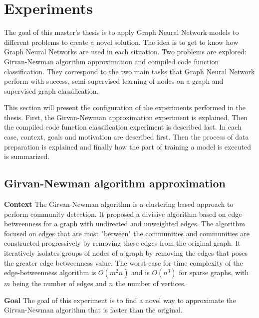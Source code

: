 \newpage
\section{Experiments}

The goal of this master's thesis is to apply Graph Neural Network models to different problems to create a novel solution. The idea is to get to know how Graph Neural Networks are used in each situation. Two problems are explored: Girvan-Newman algorithm approximation and compiled code function classification. They correspond to the two main tasks that Graph Neural Network perform with success, semi-supervised learning of nodes on a graph and supervised graph classification. 

This section will present the configuration of the experiments performed in the thesis. First, the Girvan-Newman approximation experiment is explained. Then the compiled code function classification experiment is described last. In each case, context, goals and motivation are described first. Then the process of data preparation is explained and finally how the part of training a model is executed is summarized.

\subsection{Girvan-Newman algorithm approximation}

\textbf{Context} 
The Girvan-Newman algorithm is a clustering based approach to perform community detection. It proposed a divisive algorithm based on edge-betweenness for a graph with undirected and unweighted edges. The algorithm focused on edges that are most "between" the communities and communities are constructed progressively by removing these edges from the original graph. It iteratively isolates groups of nodes of a graph by removing the edges that poses the greater edge betweenness value. The worst-case for time complexity of the edge-betweenness algorithm is $O(m^2n)$ and is $O(n^3)$ for sparse graphs, with $m$ being the number of edges and $n$ the number of vertices. 

\textbf{Goal}
The goal of this experiment is to find a novel way to approximate the Girvan-Newman algorithm that is faster than the original.


